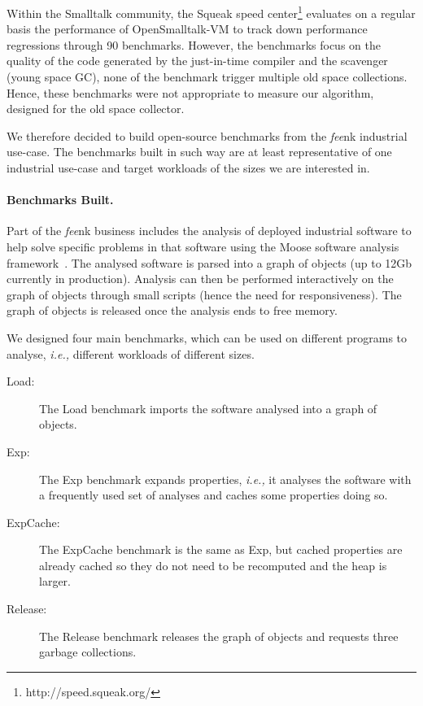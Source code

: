 \documentclass[sigplan,10pt,screen]{acmart}\settopmatter{printfolios=true,printccs=true,printacmref=true}
\def\feenk{\textit{fee}\textsf{nk}\xspace}
\def\OpenSmalltalkVM{OpenSmalltalk-VM\xspace}
\def\ie{\emph{i.e., }}
\begin{document}
Within the Smalltalk community, the Squeak speed center\footnote{http://speed.squeak.org/} evaluates on a regular basis the performance of \OpenSmalltalkVM to track down performance regressions through 90 benchmarks. However, the benchmarks focus on the quality of the code generated by the just-in-time compiler and the scavenger (young space GC), none of the benchmark trigger multiple old space collections. Hence, these benchmarks were not appropriate to measure our algorithm, designed for the old space collector.

We therefore decided to build open-source benchmarks from the \feenk industrial use-case. The benchmarks built in such way are at least representative of one industrial use-case and target workloads of the sizes we are interested in.



\paragraph{Benchmarks Built.} Part of the \feenk business includes the analysis of deployed industrial software to help solve specific problems in that software using the Moose software analysis framework~\cite{MooseBook1,MoosePaper1}. The analysed software is parsed into a graph of objects (up to 12Gb currently in production). Analysis can then be performed interactively on the graph of objects through small scripts (hence the need for responsiveness). The graph of objects is released once the analysis ends to free memory. 

We designed four main benchmarks, which can be used on different programs to analyse, \ie different workloads of different sizes. 
\begin{description}
	\item[Load:] The Load benchmark imports the software analysed into a graph of objects.
	\item[Exp:] The Exp benchmark expands properties, \ie it analyses the software with a frequently used set of analyses %
	and caches some properties doing so.	
	\item[ExpCache:] The ExpCache benchmark is the same as Exp, but cached properties are already cached so they do not need to be recomputed and the heap is larger.
	\item[Release:] The Release benchmark releases the graph of objects and requests three garbage collections.
\end{description}
\end{document}
